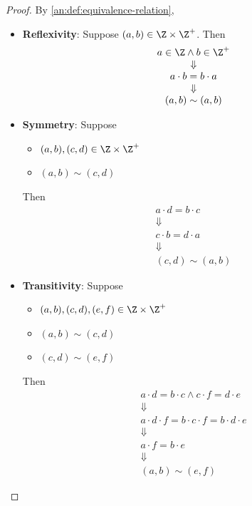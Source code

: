 \begin{proof}
  By \cref{an:def:equivalence-relation},
  \begin{itemize}
    \item \textbf{Reflexivity}: Suppose $(a, b) \in \Z \times \Z^{+}$. Then
          \[
            \begin{array}{c}
              a \in \Z \land b \in \Z^{+} \\
              \Downarrow                  \\
              a \cdot b = b \cdot a       \\
              \Downarrow                  \\
              (a, b) \sim (a, b)
            \end{array}
          \]
    \item \textbf{Symmetry}: Suppose
          \begin{itemize}
            \item $(a, b), (c, d) \in \Z \times \Z^{+}$
            \item $(a, b) \sim (c, d)$
          \end{itemize}
          Then
          \[
            \begin{array}{c}
              a \cdot d = b \cdot c \\
              \Downarrow            \\
              c \cdot b = d \cdot a \\
              \Downarrow            \\
              (c, d) \sim (a, b)
            \end{array}
          \]
    \item \textbf{Transitivity}: Suppose
          \begin{itemize}
            \item $(a, b), (c, d), (e, f) \in \Z \times \Z^{+}$
            \item $(a, b) \sim (c, d)$
            \item $(c, d) \sim (e, f)$
          \end{itemize}
          Then
          \[
            \begin{array}{c}
              a \cdot d = b \cdot c \land c \cdot f = d \cdot e         \\
              \Downarrow                                                \\
              a \cdot d \cdot f = b \cdot c \cdot f = b \cdot d \cdot e \\
              \Downarrow                                                \\
              a \cdot f = b \cdot e                                     \\
              \Downarrow                                                \\
              (a, b) \sim (e, f)
            \end{array}
          \]
  \end{itemize}
\end{proof}

